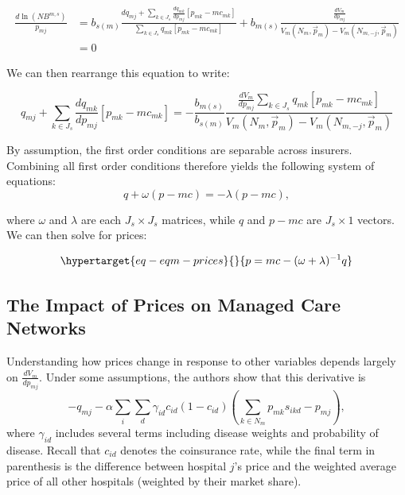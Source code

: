 \documentclass[
  letterpaper,
  DIV=11,
  numbers=noendperiod]{scrreport}
\theoremstyle{definition}
\theoremstyle{remark}
\begin{document}
\[\begin{align*}
\frac{d \ln (NB^{m,s})}{p_{mj}} &= b_{s(m)} \frac{d q_{mj} + \sum_{k\in J_{s}} \frac{d q_{mk}}{d p_{mj}} \left[p_{mk}-mc_{mk}\right]}{\sum_{k\in J_{s}} q_{mk}\left[p_{mk}-mc_{mk}\right]} + b_{m(s)} \frac{\frac{d V_{m}}{d p_{mj}}}{V_{m}(N_{m},\vec{p}_{m})-V_{m}(N_{m,-j},\vec{p}_{m})} \\
&= 0 \end{align*}\]

We can then rearrange this equation to write:

\[q_{mj} + \sum_{k\in J_{s}} \frac{d q_{mk}}{d p_{mj}} \left[p_{mk}-mc_{mk}\right] = -\frac{b_{m(s)}}{b_{s(m)}} \frac{\frac{d V_{m}}{d p_{mj}} \sum_{k\in J_{s}} q_{mk}\left[p_{mk}-mc_{mk}\right]}{V_{m}(N_{m},\vec{p}_{m})-V_{m}(N_{m,-j},\vec{p}_{m})}\]

By assumption, the first order conditions are separable across insurers.
Combining all first order conditions therefore yields the following
system of equations: \[q + \omega (p-mc) = -\lambda (p-mc),\]

where \(\omega\) and \(\lambda\) are each \(J_{s} \times J_{s}\)
matrices, while \(q\) and \(p-mc\) are \(J_{s} \times 1\) vectors. We
can then solve for prices:

\begin{equation}\protect\hypertarget{eq-eqm-prices}{}{p = mc - (\omega + \lambda)^{-1} q}\label{eq-eqm-prices}\end{equation}

\hypertarget{the-impact-of-prices-on-managed-care-networks}{%
\subsection{The Impact of Prices on Managed Care
Networks}\label{the-impact-of-prices-on-managed-care-networks}}

Understanding how prices change in response to other variables depends
largely on \(\frac{d V_{m}}{d p_{mj}}\). Under some assumptions, the
authors show that this derivative is
\[-q_{mj}-\alpha \sum_{i}\sum_{d}\gamma_{id}c_{id}(1-c_{id}) \left(\sum_{k\in N_{m}} p_{mk}s_{ikd} - p_{mj}\right),\]
where \(\gamma_{id}\) includes several terms including disease weights
and probability of disease. Recall that \(c_{id}\) denotes the
coinsurance rate, while the final term in parenthesis is the difference
between hospital \(j\)'s price and the weighted average price of all
other hospitals (weighted by their market share).
\end{document}
